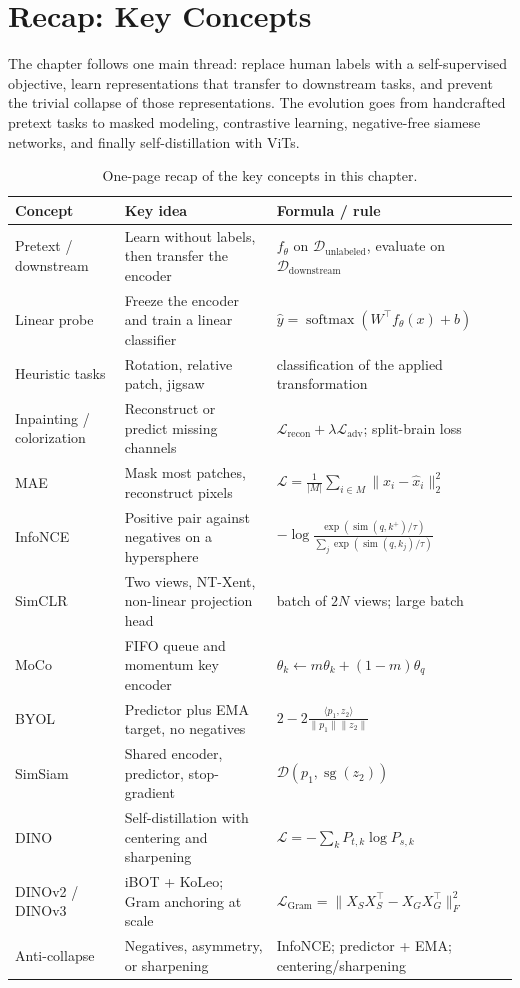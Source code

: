 \newpage
\section{Recap: Key Concepts}

The chapter follows one main thread: replace human labels with a self-supervised objective, learn representations that transfer to downstream tasks, and prevent the trivial collapse of those representations. The evolution goes from handcrafted pretext tasks to masked modeling, contrastive learning, negative-free siamese networks, and finally self-distillation with ViTs.

\begin{table}[htbp]
\centering
\small
\renewcommand{\arraystretch}{1.15}
\begin{tabular}{p{} p{} p{}}
\toprule
\textbf{Concept} & \textbf{Key idea} & \textbf{Formula / rule} \\
\midrule
Pretext / downstream & Learn without labels, then transfer the encoder & $f_\theta$ on $\mathcal{D}_{\text{unlabeled}}$, evaluate on $\mathcal{D}_{\text{downstream}}$ \\
Linear probe & Freeze the encoder and train a linear classifier & $\hat{y}=\operatorname{softmax}(W^\top f_\theta(x)+b)$ \\
Heuristic tasks & Rotation, relative patch, jigsaw & classification of the applied transformation \\
Inpainting / colorization & Reconstruct or predict missing channels & $\mathcal{L}_{\text{recon}}+\lambda\mathcal{L}_{\text{adv}}$; split-brain loss \\
MAE & Mask most patches, reconstruct pixels & $\mathcal{L}=\frac{1}{|M|}\sum_{i\in M}\|x_i-\hat{x}_i\|_2^2$ \\
InfoNCE & Positive pair against negatives on a hypersphere & $-\log\frac{\exp(\operatorname{sim}(q,k^+)/\tau)}{\sum_j\exp(\operatorname{sim}(q,k_j)/\tau)}$ \\
SimCLR & Two views, NT-Xent, non-linear projection head & batch of $2N$ views; large batch \\
MoCo & FIFO queue and momentum key encoder & $\theta_k\leftarrow m\theta_k+(1-m)\theta_q$ \\
BYOL & Predictor plus EMA target, no negatives & $2-2\frac{\langle p_1,z_2\rangle}{\|p_1\|\|z_2\|}$ \\
SimSiam & Shared encoder, predictor, stop-gradient & $\mathcal{D}(p_1,\operatorname{sg}(z_2))$ \\
DINO & Self-distillation with centering and sharpening & $\mathcal{L}=-\sum_k P_{t,k}\log P_{s,k}$ \\
DINOv2 / DINOv3 & iBOT + KoLeo; Gram anchoring at scale & $\mathcal{L}_{\text{Gram}}=\|X_SX_S^\top-X_GX_G^\top\|_F^2$ \\
Anti-collapse & Negatives, asymmetry, or sharpening & InfoNCE; predictor + EMA; centering/sharpening \\
\bottomrule
\end{tabular}
\caption{One-page recap of the key concepts in this chapter.}\label{tab:ch5_recap}
\end{table}

